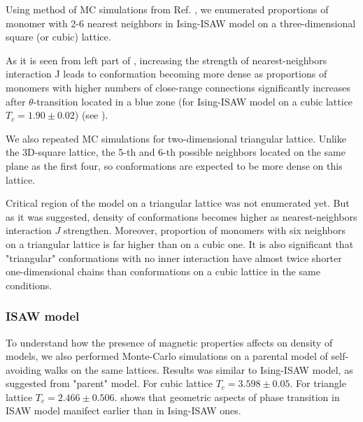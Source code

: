 \documentclass[aps,pre,amssymb,amsmath,twocolumn,floatfix]{revtex4-2}
\begin{document}
Using method of MC simulations from Ref. \cite{faizullina2021critical}, we enumerated proportions of monomer with 2-6 nearest neighbors in Ising-ISAW model on a three-dimensional square (or cubic) lattice.

As it is seen from left part of , increasing the strength of nearest-neighbors interaction J leads to conformation becoming more dense as proportions of monomers with higher numbers of close-range connections significantly increases after $\theta$-transition located in a blue zone (for Ising-ISAW model on a cubic lattice $T_{c} = 1.90 \pm 0.02$\cite{Foster2021}) (see ).

We also repeated MC simulations for two-dimensional triangular lattice. Unlike the 3D-square lattice, the 5-th and 6-th possible neighbors located on the same plane as the first four, so conformations are expected to be more dense on this lattice.


Critical region of the model on a triangular lattice was not enumerated yet. But as it was suggested, density of conformations becomes higher as nearest-neighbors interaction $J$ strengthen. Moreover, proportion of monomers with six neighbors on a triangular lattice is far higher than on a cubic one. It is also significant that "triangular" conformations with no inner interaction have almost twice shorter one-dimensional chains than conformations on a cubic lattice in the same conditions.

\subsubsection{ISAW model}

To understand how the presence of magnetic properties affects on density of models, we also performed Monte-Carlo simulations on a parental model of self-avoiding walks on the same lattices. Results was similar to Ising-ISAW model, as suggested from "parent" model. For cubic lattice $T_{c} = 3.598 \pm 0.05 $\cite{Tesi1996}. For triangle lattice $T_{c} = 2.466 \pm 0.506 $\cite{Privman1986}.  shows that geometric aspects of phase transition in ISAW model manifect earlier than in Ising-ISAW ones.  
\end{document}
